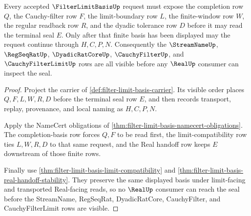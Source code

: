 \begin{theorem}
\label{thm:filter-limit-basis-window-basis-exhaustion}
Every accepted $\FilterLimitBasisUp$ request must expose the completion row $Q$, the Cauchy-filter row $F$, the limit-boundary row $L$, the finite-window row $W$, the regular readback row $R$, and the dyadic tolerance row $D$ before it may read the terminal seal $E$. Only after that finite basis has been displayed may the request continue through $H,C,P,N$. Consequently the $\StreamNameUp$, $\RegSeqRatUp$, $\DyadicRatCoreUp$, $\CauchyFilterUp$, and $\CauchyFilterLimitUp$ rows are all visible before any $\RealUp$ consumer can inspect the seal.
\end{theorem}
\begin{proof}
Project the carrier of \autoref{def:filter-limit-basis-carrier}. Its visible order places $Q,F,L,W,R,D$ before the terminal seal row $E$, and then records transport, replay, provenance, and local naming as $H,C,P,N$.

Apply the NameCert obligations of \autoref{thm:filter-limit-basis-namecert-obligations}. The completion-basis row forces $Q,F$ to be read first, the limit-compatibility row ties $L,W,R,D$ to that same request, and the Real handoff row keeps $E$ downstream of those finite rows.

Finally use \autoref{thm:filter-limit-basis-limit-compatibility} and \autoref{thm:filter-limit-basis-real-handoff-stability}. They preserve the same displayed basis under limit-facing and transported Real-facing reads, so no $\RealUp$ consumer can reach the seal before the StreamName, RegSeqRat, DyadicRatCore, CauchyFilter, and CauchyFilterLimit rows are visible.
\end{proof}

